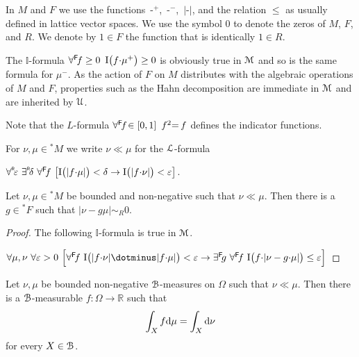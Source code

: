 \documentclass[11pt,oneside]{amsart}
\begin{document}
In $M$ and $F$ we use the functions $\,\mbox{-}^+$, $\,\mbox{-}^-$, $\,|\mbox{-}|$, and the relation $\le$ as usually defined in lattice vector spaces.
We use the symbol $0$ to denote the zeros of $M$, $F$, and $R$.
We denote by $1\in F$ the function that is identically $1\in R$.

The $\mathds{I}$-formula $\forall^{\sf F}\!f\ge0\,\ {\rm I}\big(f{\cdot}\mu^+\big)\ge0$ is obviously true in ${\EuScript M}$ and so is the same formula for $\mu^-$.
As the action of $F$ on $M$ distributes with the algebraic operations of $M$ and $F$, properties such as the Hahn decomposition are immediate in ${\EuScript M}$ and are inherited by $\EuScript U$.

Note that the $L$-formula $\forall^{\sf F}\!f\!\in[0,1]\,\ f^2{=}\,f$ defines the indicator functions. 

For $\nu,\mu\in{}^*\!M$ we write $\nu\ll\mu$ for the ${\EuScript L}$-formula 

\hfil$\forallR \varepsilon\ \existsR \delta\ \forall^{\sf F}\!f\ \big[{\rm I}\big(|f{\cdot}\mu|\big)<\delta\rightarrow {\rm I}\big(|f{\cdot}\nu|\big)<\varepsilon\big]$.

\begin{proposition} 
  Let $\nu,\mu\in{}^*\!M$ be bounded and non-negative such that  $\nu\ll\mu$.
  Then there is a $g\in{}^*\!F$ such that $|\nu-g\mu|\sim_R0$.
\end{proposition}

\begin{proof}
  The following $\mathds{I}$-formula is true in ${\EuScript M}$.
  
  $
\forall\mu,\nu\ \forall\varepsilon>0\ \Big[\forall^{\sf F}\!f\ {\rm I}\big(|f{\cdot}\nu|\dotminus|f{\cdot}\mu|\big)<\varepsilon \rightarrow \exists^{\sf F}\!g\ \forall^{\sf F}\! f\ {\rm I}\big(f{\cdot}|\nu-g{\cdot}\mu|\big)\le\varepsilon\Big]$


\end{proof}

\begin{theorem} 
  Let $\nu,\mu$ be bounded non-negative ${\EuScript B}$-measures on $\Omega$ such that $\nu\ll\mu$.
  Then there is a ${\EuScript B}$-measurable $f:\Omega\to\mathds{R}$ such that 
  $$
  \int_X f{\rm d}\mu = \int_X {\rm d}\nu
  $$
  for every $X\in{\EuScript B}$.
\end{theorem}
\end{document}
